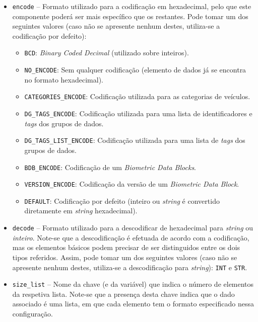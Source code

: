 \begin{itemize}
    \item \texttt{encode} -- Formato utilizado para a codificação em hexadecimal, pelo que este componente poderá ser mais específico que os restantes. Pode tomar um dos seguintes valores (caso não se apresente nenhum destes, utiliza-se a codificação por defeito):
    \begin{itemize}
        \item \texttt{BCD}: \textit{Binary Coded Decimal} (utilizado sobre inteiros).
        \item \texttt{NO\_ENCODE}: Sem qualquer codificação (elemento de dados já se encontra no formato hexadecimal).
        \item \texttt{CATEGORIES\_ENCODE}: Codificação utilizada para as categorias de veículos.
        \item \texttt{DG\_TAGS\_ENCODE}: Codificação utilizada para uma lista de identificadores e \textit{tags} dos grupos de dados.
        \item \texttt{DG\_TAGS\_LIST\_ENCODE}: Codificação utilizada para uma lista de \textit{tags} dos grupos de dados.
        \item \texttt{BDB\_ENCODE}: Codificação de um \textit{Biometric Data Blocks}.
        \item \texttt{VERSION\_ENCODE}: Codificação da versão de um \textit{Biometric Data Block}.
        \item \texttt{DEFAULT}: Codificação por defeito (inteiro ou \textit{string} é convertido diretamente em \textit{string} hexadecimal).
    \end{itemize}
    
    \item \texttt{decode} -- Formato utilizado para a descodificar de hexadecimal para \textit{string} ou \textit{inteiro}. Note-se que a descodificação é efetuada de acordo com a codificação, mas os elementos básicos podem precisar de ser distinguidos entre os dois tipos referidos. Assim, pode tomar um dos seguintes valores (caso não se apresente nenhum destes, utiliza-se a descodificação para \textit{string}): \texttt{INT} e \texttt{STR}.
    
    \item \texttt{size\_list} -- Nome da chave (e da variável) que indica o número de elementos da respetiva lista. Note-se que a presença desta chave indica que o dado associado é uma lista, em que cada elemento tem o formato especificado nessa configuração.
\end{itemize}

